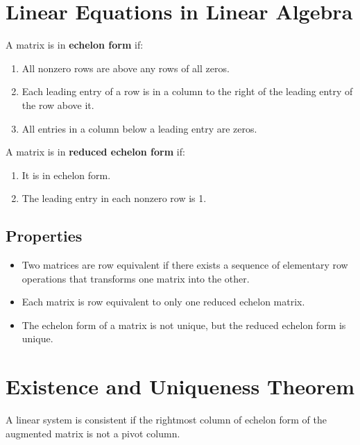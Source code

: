 \documentclass{article}
\begin{document}
\setlength{\parindent}{0pt}

\section*{Linear Equations in Linear Algebra}

A matrix is in \textbf{echelon form} if:
\begin{enumerate}
    \item All nonzero rows are above any rows of all zeros.
    \item Each leading entry of a row is in a column to the right of the leading entry of the row
    above it.
    \item All entries in a column below a leading entry are zeros.
\end{enumerate}

\noindent
A matrix is in \textbf{reduced echelon form} if:
\begin{enumerate}
    \item It is in echelon form.
    \item The leading entry in each nonzero row is 1.
\end{enumerate}

\subsection*{Properties}
\begin{itemize}
    \item Two matrices are row equivalent if there exists a sequence of elementary row operations
    that transforms one matrix into the other.
    \item Each matrix is row equivalent to only one reduced echelon matrix.
    \item The echelon form of a matrix is not unique, but the reduced echelon form is unique.
\end{itemize}

\section*{Existence and Uniqueness Theorem}
A linear system is consistent if the rightmost column of echelon form of the augmented matrix is
not a pivot column.
\end{document}
